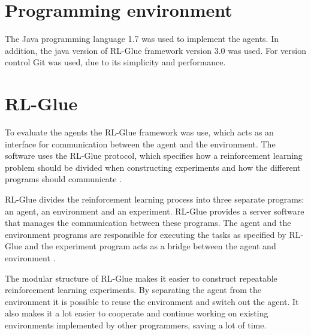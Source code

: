 \section{Programming environment}
\label{sec:prog_env}

The Java programming language 1.7 was used to implement the agents. In addition, the
java version of RL-Glue framework version 3.0 was used. For version control Git
was used, due to its simplicity and performance.

\section{RL-Glue}
\label{sec:rl_glue}

To evaluate the agents the RL-Glue framework was use, which acts as an
interface for communication between the agent and the environment. The software
uses the RL-Glue protocol, which specifies how a reinforcement learning problem
should be divided when constructing experiments and how the different programs
should communicate \parencite{tanner2009rl}.

RL-Glue divides the reinforcement learning process into three separate
programs: an agent, an environment and an experiment. RL-Glue provides a server
software that manages the communication between these programs. The agent and
the environment programs are responsible for executing the tasks as specified
by RL-Glue and the experiment program acts as a bridge between the agent and
environment \parencite{tanner2009rl}.

The modular structure of RL-Glue makes it easier to construct repeatable
reinforcement learning experiments. By separating the agent from the
environment it is possible to reuse the environment and switch out the agent.
It also makes it a lot easier to cooperate and continue working on existing
environments implemented by other programmers, saving a lot of time.
